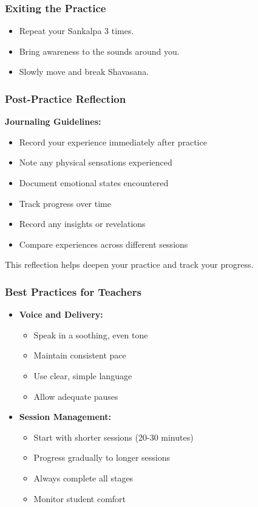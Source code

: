 \begin{frame}[fragile]\frametitle{Exiting the Practice}
    \begin{itemize}
        \item Repeat your Sankalpa 3 times.
        \item Bring awareness to the sounds around you.
        \item Slowly move and break Shavasana.
    \end{itemize}
\end{frame}

\begin{frame}[fragile]\frametitle{Post-Practice Reflection}
    \textbf{Journaling Guidelines:}
    \begin{itemize}
        \item Record your experience immediately after practice
        \item Note any physical sensations experienced
        \item Document emotional states encountered
        \item Track progress over time
        \item Record any insights or revelations
        \item Compare experiences across different sessions
    \end{itemize}
    \small{This reflection helps deepen your practice and track your progress.}
\end{frame}

\begin{frame}[fragile]\frametitle{Best Practices for Teachers}
    \begin{itemize}
        \item \textbf{Voice and Delivery:}
        \begin{itemize}
            \item Speak in a soothing, even tone
            \item Maintain consistent pace
            \item Use clear, simple language
            \item Allow adequate pauses
        \end{itemize}
        \item \textbf{Session Management:}
        \begin{itemize}
            \item Start with shorter sessions (20-30 minutes)
            \item Progress gradually to longer sessions
            \item Always complete all stages
            \item Monitor student comfort
        \end{itemize}
    \end{itemize}
\end{frame}

